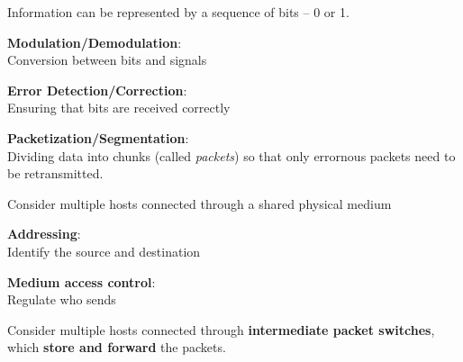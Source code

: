 \begin{frame}[t]\normalsize
	Information can be represented by a sequence of bits -- 0 or 1.
\end{frame}

\begin{frame} \begin{center} \large
	\textbf{Modulation/Demodulation}:\\ Conversion between bits and signals\\
\end{center} \end{frame}

\begin{frame} \begin{center} \large
	\textbf{Error Detection/Correction}:\\ Ensuring that bits are received correctly\\
\end{center} \end{frame}

\begin{frame}\begin{center}\large
	\textbf{Packetization/Segmentation}:\\ \large Dividing data into chunks (called \textit{packets}) 
	so that only errornous packets need to be retransmitted.
\end{center}\end{frame}

\begin{frame}[t]\normalsize
	Consider multiple hosts connected through a shared physical medium
\end{frame}

\begin{frame}\begin{center}\large
	\textbf{Addressing}:\\ Identify the source and destination
\end{center}\end{frame}

\begin{frame}\begin{center}\large
	\textbf{Medium access control}:\\ Regulate who sends
\end{center}\end{frame}

\begin{frame}[t]\normalsize
	Consider multiple hosts connected through \textbf{intermediate packet switches}, 
	which \textbf{store and forward} the packets.
\end{frame}

